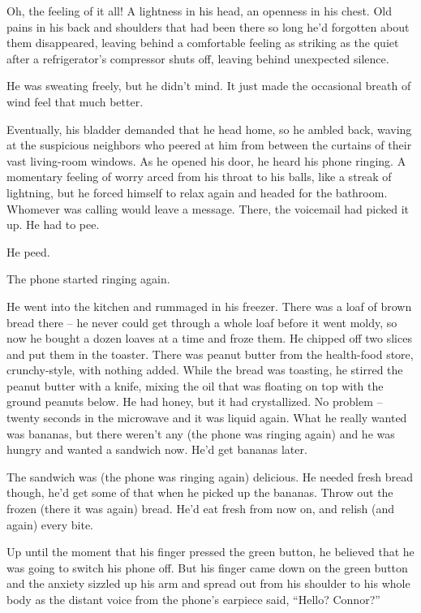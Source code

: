 Oh, the feeling of it all! A lightness in his head, an openness in
his chest. Old pains in his back and shoulders that had been there
so long he'd forgotten about them disappeared, leaving behind a
comfortable feeling as striking as the quiet after a refrigerator's
compressor shuts off, leaving behind unexpected silence.

He was sweating freely, but he didn't mind. It just made the
occasional breath of wind feel that much better.

Eventually, his bladder demanded that he head home, so he ambled
back, waving at the suspicious neighbors who peered at him from
between the curtains of their vast living-room windows. As he
opened his door, he heard his phone ringing. A momentary feeling of
worry arced from his throat to his balls, like a streak of
lightning, but he forced himself to relax again and headed for the
bathroom. Whomever was calling would leave a message. There, the
voicemail had picked it up. He had to pee.

He peed.

The phone started ringing again.

He went into the kitchen and rummaged in his freezer. There was a
loaf of brown bread there -- he never could get through a whole
loaf before it went moldy, so now he bought a dozen loaves at a
time and froze them. He chipped off two slices and put them in the
toaster. There was peanut butter from the health-food store,
crunchy-style, with nothing added. While the bread was toasting, he
stirred the peanut butter with a knife, mixing the oil that was
floating on top with the ground peanuts below. He had honey, but it
had crystallized. No problem -- twenty seconds in the microwave and
it was liquid again. What he really wanted was bananas, but there
weren't any (the phone was ringing again) and he was hungry and
wanted a sandwich now. He'd get bananas later.

The sandwich was (the phone was ringing again) delicious. He needed
fresh bread though, he'd get some of that when he picked up the
bananas. Throw out the frozen (there it was again) bread. He'd eat
fresh from now on, and relish (and again) every bite.

Up until the moment that his finger pressed the green button, he
believed that he was going to switch his phone off. But his finger
came down on the green button and the anxiety sizzled up his arm
and spread out from his shoulder to his whole body as the distant
voice from the phone's earpiece said, ``Hello? Connor?''

